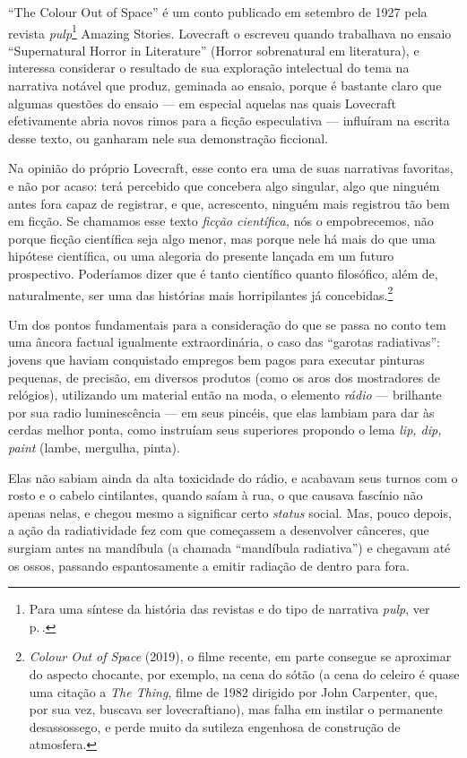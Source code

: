 ``The Colour Out of Space'' é um conto publicado em setembro de 1927
pela revista \emph{pulp}\footnote{Para uma síntese da história das
  revistas e do tipo de narrativa \emph{pulp}, ver p.\,\pageref{pulp}.} Amazing Stories. Lovecraft o escreveu quando
trabalhava no ensaio ``Supernatural Horror in Literature'' (Horror
sobrenatural em literatura), e interessa considerar o resultado de sua
exploração intelectual do tema na narrativa notável que produz, geminada
ao ensaio, porque é bastante claro que algumas questões do ensaio --- em
especial aquelas nas quais Lovecraft efetivamente abria novos rimos para
a ficção especulativa --- influíram na escrita desse texto, ou ganharam
nele sua demonstração ficcional.

Na opinião do próprio Lovecraft, esse conto era uma de suas narrativas
favoritas, e não por acaso: terá percebido que concebera algo singular,
algo que ninguém antes fora capaz de registrar, e que, acrescento,
ninguém mais registrou tão bem em ficção. Se chamamos esse texto
\emph{ficção científica,} nós o empobrecemos, não porque ficção
científica seja algo menor, mas porque nele há mais do que uma hipótese
científica, ou uma alegoria do presente lançada em um futuro
prospectivo. Poderíamos dizer que é tanto científico quanto filosófico,
além de, naturalmente, ser uma das histórias mais horripilantes já
concebidas.\footnote{\emph{Colour Out of Space} (2019), o filme recente,
  em parte consegue se aproximar do aspecto chocante, por exemplo, na
  cena do sótão (a cena do celeiro é quase uma citação a \emph{The
  Thing}, filme de 1982 dirigido por John Carpenter, que, por sua vez,
  buscava ser lovecraftiano), mas falha em instilar o permanente
  desassossego, e perde muito da sutileza engenhosa de construção de
  atmosfera.}

Um dos pontos fundamentais para a consideração do que se passa no conto
tem uma âncora factual igualmente extraordinária, o caso das ``garotas
radiativas'': jovens que haviam conquistado empregos bem pagos para
executar pinturas pequenas, de precisão, em diversos produtos (como os
aros dos mostradores de relógios), utilizando um material então na moda,
o elemento \emph{rádio} --- brilhante por sua radio luminescência --- em
seus pincéis, que elas lambiam para dar às cerdas melhor ponta, como
instruíam seus superiores propondo o lema \emph{lip, dip, paint} (lambe,
mergulha, pinta).

Elas não sabiam ainda da alta toxicidade do rádio, e acabavam seus
turnos com o rosto e o cabelo cintilantes, quando saíam à rua, o que
causava fascínio não apenas nelas, e chegou mesmo a significar certo
\emph{status} social. Mas, pouco depois, a ação da radiatividade fez com
que começassem a desenvolver cânceres, que surgiam antes na mandíbula (a
chamada ``mandíbula radiativa'') e chegavam até os ossos, passando
espantosamente a emitir radiação de dentro para fora.

